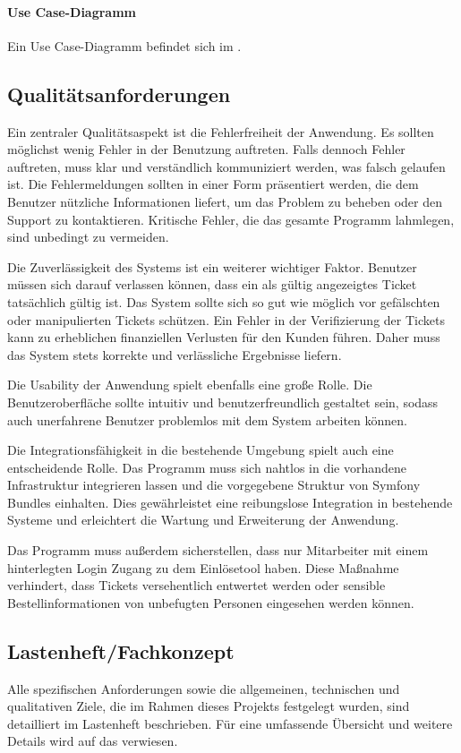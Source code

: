 \paragraph{Use Case-Diagramm}
Ein Use Case-Diagramm befindet sich im .

\subsection{Qualitätsanforderungen}
\label{sec:Qualitaetsanforderungen}

Ein zentraler Qualitätsaspekt ist die Fehlerfreiheit der Anwendung. Es sollten möglichst wenig Fehler in der Benutzung auftreten. Falls dennoch Fehler auftreten, muss klar und verständlich kommuniziert werden, was falsch gelaufen ist. Die Fehlermeldungen sollten in einer Form präsentiert werden, die dem Benutzer nützliche Informationen liefert, um das Problem zu beheben oder den Support zu kontaktieren. Kritische Fehler, die das gesamte Programm lahmlegen, sind unbedingt zu vermeiden.

Die Zuverlässigkeit des Systems ist ein weiterer wichtiger Faktor. Benutzer müssen sich darauf verlassen können, dass ein als gültig angezeigtes Ticket tatsächlich gültig ist. Das System sollte sich so gut wie möglich vor gefälschten oder manipulierten Tickets schützen. Ein Fehler in der Verifizierung der Tickets kann zu erheblichen finanziellen Verlusten für den Kunden führen. Daher muss das System stets korrekte und verlässliche Ergebnisse liefern.

Die Usability der Anwendung spielt ebenfalls eine große Rolle. Die Benutzeroberfläche sollte intuitiv und benutzerfreundlich gestaltet sein, sodass auch unerfahrene Benutzer problemlos mit dem System arbeiten können.

Die Integrationsfähigkeit in die bestehende Umgebung spielt auch eine entscheidende Rolle. Das Programm muss sich nahtlos in die vorhandene Infrastruktur integrieren lassen und die vorgegebene Struktur von Symfony Bundles einhalten. Dies gewährleistet eine reibungslose Integration in bestehende Systeme und erleichtert die Wartung und Erweiterung der Anwendung.

Das Programm muss außerdem sicherstellen, dass nur Mitarbeiter mit einem hinterlegten Login Zugang zu dem Einlösetool haben. Diese Maßnahme verhindert, dass Tickets versehentlich entwertet werden oder sensible Bestellinformationen von unbefugten Personen eingesehen werden können.

\subsection{Lastenheft/Fachkonzept}
\label{sec:Lastenheft}
Alle spezifischen Anforderungen sowie die allgemeinen, technischen und qualitativen Ziele, die im Rahmen dieses Projekts festgelegt wurden, sind detailliert im Lastenheft beschrieben. Für eine umfassende Übersicht und weitere Details wird auf das  verwiesen.
